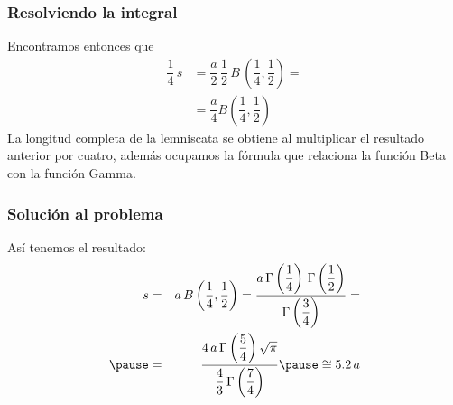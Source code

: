 \begin{frame}
\frametitle{Resolviendo la integral}
Encontramos entonces que
\begin{align*}
\dfrac{1}{4} \, s &= \dfrac{a}{2} \, \dfrac{1}{2} \, B \, \left(\dfrac{1}{4}, \dfrac{1}{2} \right) = \\[1em]
&= \dfrac{a}{4} B\left(\dfrac{1}{4}, \dfrac{1}{2} \right)
\end{align*}
\pause
\fontsize{12}{12}\selectfont
La longitud completa de la lemniscata se obtiene al multiplicar el resultado anterior por cuatro, además ocupamos la fórmula que relaciona la función Beta con la función Gamma.
\end{frame}
\begin{frame}
\frametitle{Solución al problema}
Así tenemos el resultado:
\begin{eqnarray*}
s &=& a \, B\left(\dfrac{1}{4}, \dfrac{1}{2} \right) = \dfrac{a \, \Gamma \left( \dfrac{1}{4} \right) \, \Gamma \left( \dfrac{1}{2} \right) }{\Gamma \left( \dfrac{3}{4} \right)} = \\ \pause
&=& \dfrac{4 \, a \, \Gamma \left( \dfrac{5}{4} \right) \sqrt{\pi}}{\dfrac{4}{3} \, \Gamma \left( \dfrac{7}{4} \right)} \pause \cong 5.2 \, a
\end{eqnarray*}
\end{frame}
